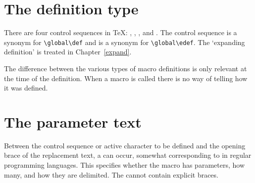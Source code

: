 \section{The definition type}

There are four  control sequences in \TeX:
, , , and .
The control sequence 
\alt
{} is a synonym for \verb>\global\def> and
 is a synonym for \verb>\global\edef>.
The `expanding definition'  is treated in 
Chapter~\ref{expand}.

The difference between the various types of macro definitions
is only relevant at the time of the definition.
When a macro is called there is no way of telling how
it was defined.

\section{The parameter text}
\label{param:text}

Between the control sequence or active character to be defined
and the opening brace of the replacement text, a  can occur, somewhat corresponding to 
in regular programming languages. This specifies whether the macro has 
parameters,
how many, and how they are delimited. 
The  cannot contain
explicit braces.

